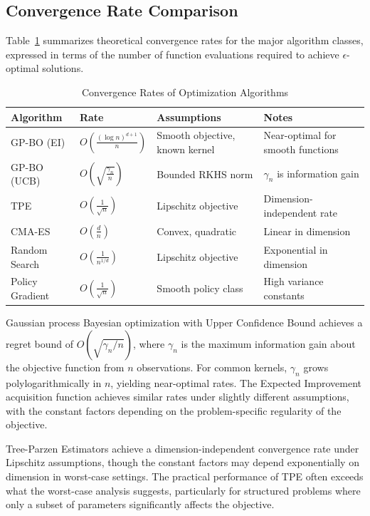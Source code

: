 \subsection{Convergence Rate Comparison}
\label{subsec:convergence_rates}

Table~\ref{tab:convergence} summarizes theoretical convergence rates for the major algorithm classes, expressed in terms of the number of function evaluations required to achieve $\epsilon$-optimal solutions.

\begin{table}[htbp]
\centering
\caption{Convergence Rates of Optimization Algorithms}
\label{tab:convergence}
\renewcommand{\arraystretch}{1.3}
\begin{tabular}{|p{2.5cm}|p{3.0cm}|p{3.0cm}|p{3.5cm}|}
\hline
\textbf{Algorithm} & \textbf{Rate} & \textbf{Assumptions} & \textbf{Notes} \\
\hline
GP-BO (EI) & $O\left(\frac{(\log n)^{d+1}}{n}\right)$ & Smooth objective, known kernel & Near-optimal for smooth functions \\
\hline
GP-BO (UCB) & $O\left(\sqrt{\frac{\gamma_n}{n}}\right)$ & Bounded RKHS norm & $\gamma_n$ is information gain \\
\hline
TPE & $O\left(\frac{1}{\sqrt{n}}\right)$ & Lipschitz objective & Dimension-independent rate \\
\hline
CMA-ES & $O\left(\frac{d}{n}\right)$ & Convex, quadratic & Linear in dimension \\
\hline
Random Search & $O\left(\frac{1}{n^{1/d}}\right)$ & Lipschitz objective & Exponential in dimension \\
\hline
Policy Gradient & $O\left(\frac{1}{\sqrt{n}}\right)$ & Smooth policy class & High variance constants \\
\hline
\end{tabular}
\end{table}

Gaussian process Bayesian optimization with Upper Confidence Bound achieves a regret bound of $O(\sqrt{\gamma_n / n})$, where $\gamma_n$ is the maximum information gain about the objective function from $n$ observations. For common kernels, $\gamma_n$ grows polylogarithmically in $n$, yielding near-optimal rates. The Expected Improvement acquisition function achieves similar rates under slightly different assumptions, with the constant factors depending on the problem-specific regularity of the objective.

Tree-Parzen Estimators achieve a dimension-independent convergence rate under Lipschitz assumptions, though the constant factors may depend exponentially on dimension in worst-case settings. The practical performance of TPE often exceeds what the worst-case analysis suggests, particularly for structured problems where only a subset of parameters significantly affects the objective.

